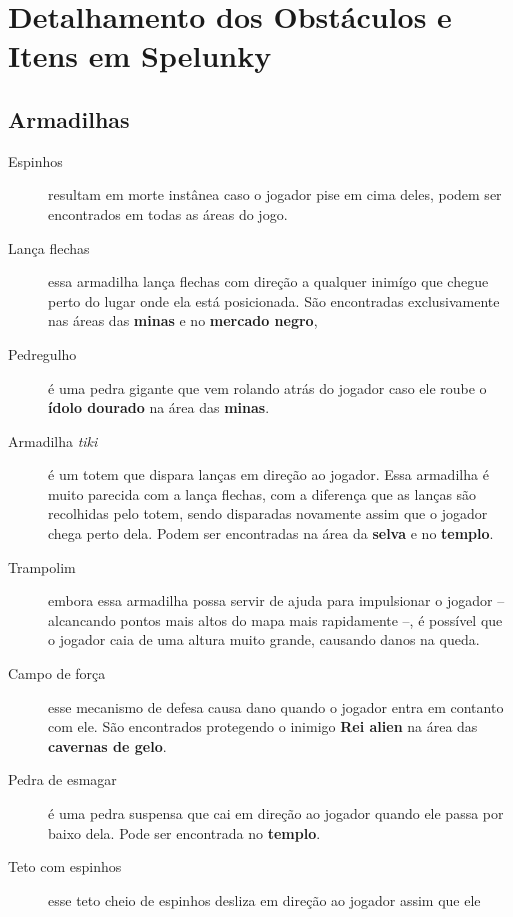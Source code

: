 \chapter{\label{appendix:spelunky-details}Detalhamento dos Obstáculos e
Itens em Spelunky}

\section{\label{section:spelunky-traps}Armadilhas}

\begin{description}
    \item[Espinhos]
        resultam em morte instânea caso o jogador pise em cima deles, podem ser
        encontrados em todas as áreas do jogo.
    \item[Lança flechas]
        essa armadilha lança flechas com direção a qualquer inimígo que chegue perto
        do lugar onde ela está posicionada. São encontradas exclusivamente nas
        áreas das \textbf{minas} e no \textbf{mercado negro}, 
    \item[Pedregulho]
        é uma pedra gigante que vem rolando atrás do jogador caso ele roube o
        \textbf{ídolo dourado} na área das \textbf{minas}.
    \item[Armadilha \textit{tiki}]
        é um totem que dispara lanças em direção ao jogador. Essa armadilha é
        muito parecida com a lança flechas, com a diferença que as lanças são
        recolhidas pelo totem, sendo disparadas novamente assim que o jogador
        chega perto dela. Podem ser encontradas na área da \textbf{selva} e no
        \textbf{templo}.
    \item[Trampolim]
        embora essa armadilha possa servir de ajuda para impulsionar o jogador
        -- alcancando pontos mais altos do mapa mais rapidamente --, é possível
        que o jogador caia de uma altura muito grande, causando danos na queda.
    \item[Campo de força]
        esse mecanismo de defesa causa dano quando o jogador entra em contanto
        com ele. São encontrados protegendo o inimigo \textbf{Rei alien} na
        área das \textbf{cavernas de gelo}.
    \item[Pedra de esmagar]
        é uma pedra suspensa que cai em direção ao jogador quando ele passa por
        baixo dela. Pode ser encontrada no \textbf{templo}.
    \item[Teto com espinhos]
        esse teto cheio de espinhos desliza em direção ao jogador assim que ele

\end{description}
